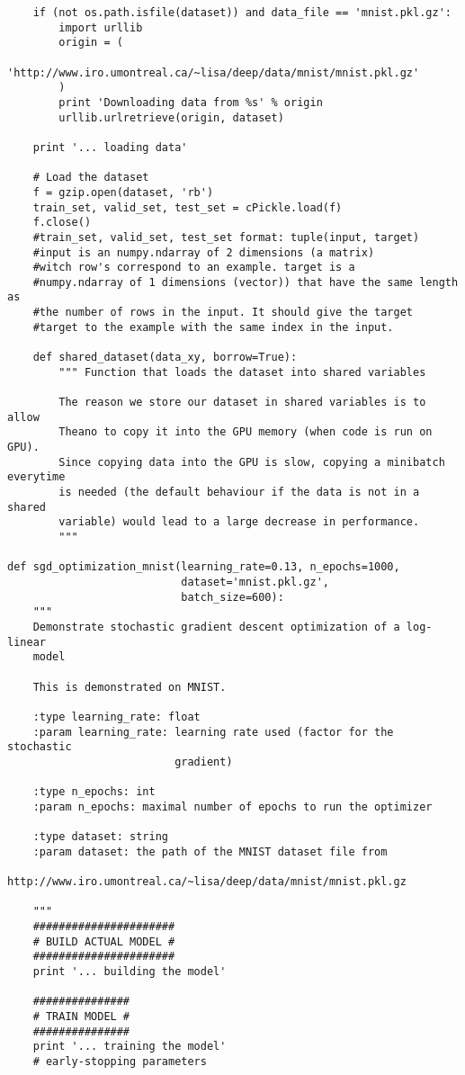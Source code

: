 \documentclass[12pt]{article}
\begin{document}
\begin{lstlisting}
    if (not os.path.isfile(dataset)) and data_file == 'mnist.pkl.gz':
        import urllib
        origin = (
            'http://www.iro.umontreal.ca/~lisa/deep/data/mnist/mnist.pkl.gz'
        )
        print 'Downloading data from %s' % origin
        urllib.urlretrieve(origin, dataset)

    print '... loading data'

    # Load the dataset
    f = gzip.open(dataset, 'rb')
    train_set, valid_set, test_set = cPickle.load(f)
    f.close()
    #train_set, valid_set, test_set format: tuple(input, target)
    #input is an numpy.ndarray of 2 dimensions (a matrix)
    #witch row's correspond to an example. target is a
    #numpy.ndarray of 1 dimensions (vector)) that have the same length as
    #the number of rows in the input. It should give the target
    #target to the example with the same index in the input.

    def shared_dataset(data_xy, borrow=True):
        """ Function that loads the dataset into shared variables

        The reason we store our dataset in shared variables is to allow
        Theano to copy it into the GPU memory (when code is run on GPU).
        Since copying data into the GPU is slow, copying a minibatch everytime
        is needed (the default behaviour if the data is not in a shared
        variable) would lead to a large decrease in performance.
        """

def sgd_optimization_mnist(learning_rate=0.13, n_epochs=1000,
                           dataset='mnist.pkl.gz',
                           batch_size=600):
    """
    Demonstrate stochastic gradient descent optimization of a log-linear
    model

    This is demonstrated on MNIST.

    :type learning_rate: float
    :param learning_rate: learning rate used (factor for the stochastic
                          gradient)

    :type n_epochs: int
    :param n_epochs: maximal number of epochs to run the optimizer

    :type dataset: string
    :param dataset: the path of the MNIST dataset file from
                 http://www.iro.umontreal.ca/~lisa/deep/data/mnist/mnist.pkl.gz

    """
    ######################
    # BUILD ACTUAL MODEL #
    ######################
    print '... building the model'

    ###############
    # TRAIN MODEL #
    ###############
    print '... training the model'
    # early-stopping parameters
  

\end{lstlisting}
\end{document}

